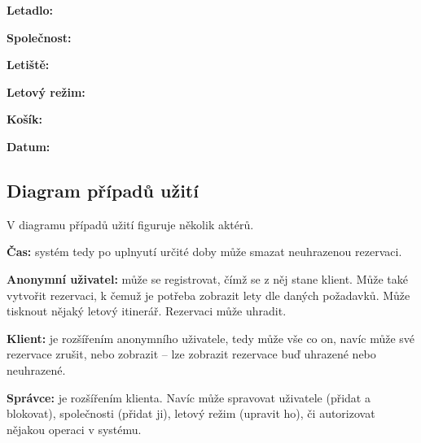 \documentclass[11pt,a4paper,landscape]{article}
\begin{document}
\begin{multicols*}{2}
\textbf{Letadlo:}

\textbf{Společnost:}

\textbf{Letiště:}

\textbf{Letový režim:}

\textbf{Košík:}

\textbf{Datum:}

 
\subsection{Diagram případů užití}
V diagramu případů užití figuruje několik aktérů.

\textbf{Čas:} systém tedy po uplnyutí určité doby může smazat neuhrazenou rezervaci.

\textbf{Anonymní uživatel:} může se registrovat, čímž se z něj stane klient. Může také vytvořit rezervaci, k čemuž je potřeba zobrazit lety dle daných požadavků. Může tisknout nějaký letový itinerář. Rezervaci může uhradit.

\textbf{Klient:} je rozšířením anonymního uživatele, tedy může vše co on, navíc může své rezervace zrušit, nebo zobrazit – lze zobrazit rezervace buď uhrazené nebo neuhrazené.

\textbf{Správce:} je rozšířením klienta. Navíc může spravovat uživatele (přidat a blokovat), společnosti (přidat ji), letový režim (upravit ho), či autorizovat nějakou operaci v systému.

\end{multicols*}
\end{document}

